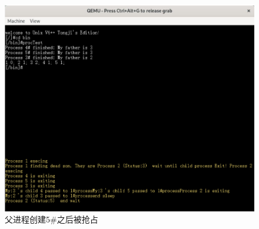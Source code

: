 \begin{figure}[!htbp]
    \centering
    \includegraphics[width=\textwidth]{images/fig7.png}
    \caption{父进程创建5\#之后被抢占}\label{fig7}
\end{figure}

